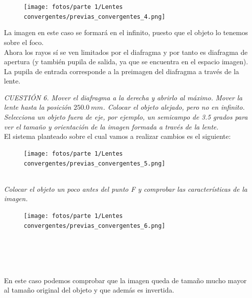 \documentclass[11pt]{article}
\begin{document}
    \begin{figure}
        \vspace{-0.6cm}
        \centering
        \texttt{[image: fotos/parte 1/Lentes convergentes/previas\_convergentes\_4.png]}
    \end{figure}
    
    \noindent La imagen en este caso se formará en el infinito, puesto que el objeto lo tenemos sobre el foco.\\
    
    Ahora los rayos sí se ven limitados por el diafragma y por tanto es diafragma de apertura (y también pupila de salida, ya que se encuentra en el espacio imagen). La pupila de entrada corresponde a la preimagen del diafragma a través de la lente.
    
    \vspace{20mm}
    \textit{CUESTIÓN 6. Mover el diafragma a la derecha y abrirlo al máximo. Mover la lente hasta la posición $250.0\ mm$. Colocar el objeto alejado, pero no en infinito. Selecciona un objeto fuera de eje, por ejemplo, un semicampo de 3.5 grados para ver el tamaño y orientación de la imagen formada a través de la lente.}\\
    
    \noindent El sistema planteado sobre el cual vamos a realizar cambios es el siguiente:
    \begin{figure}[ht]
        \centering
        \texttt{[image: fotos/parte 1/Lentes convergentes/previas\_convergentes\_5.png]}
    \end{figure}\\

    \clearpage
    \textit{Colocar el objeto un poco antes del punto F y comprobar las características de la imagen.}
    \begin{figure}
        \centering
        \texttt{[image: fotos/parte 1/Lentes convergentes/previas\_convergentes\_6.png]}
    \end{figure}

    \hspace{0cm}\\\hspace{0cm}\\\hspace{0cm}\\\hspace{0cm}\\\noindent En este caso podemos comprobar que la imagen queda de tamaño mucho mayor al tamaño original del objeto y que además es invertida.
    \\\hspace{0cm}\\\hspace{0cm}\\\hspace{0cm}\\\hspace{0cm}\\\hspace{0cm}\\
    
\end{document}
